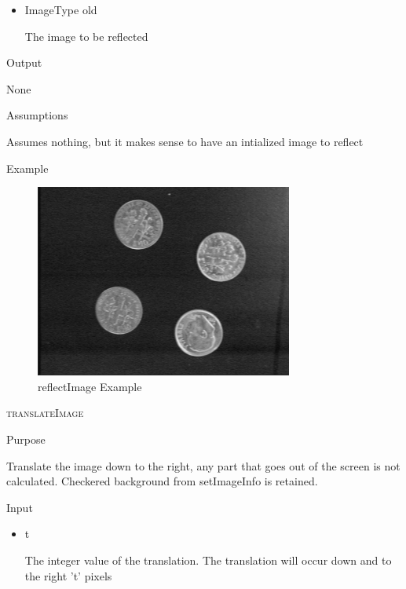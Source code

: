 \documentclass[pdftex, 11pt]{article}
\begin{document}
\begin{description}
\begin{description}
\begin{itemize}
					\item{ImageType old}

						The image to be reflected

				\end{itemize}

			\item{Output}

				None

			\item{Assumptions}

				Assumes nothing, but it makes sense to have an intialized
				image to reflect

			\item{Example}

				\begin{figure}[h]
					\centering
					\caption{reflectImage Example}
				\includegraphics{images/outreflect.png}
			\end{figure}

		\end{description}


	\item{\textsc{translateImage}}
		\begin{description}
			\item{Purpose}

				Translate the image down to the right,
				any part that goes out of the screen is
 				not calculated.  Checkered background from
				setImageInfo is retained.

			\item{Input}

				\begin{itemize}

					\item{t}

						The integer value of the translation. The
						translation will occur down and 
						to the right 't' pixels


\end{itemize}
\end{description}
\end{description}
\end{document}
